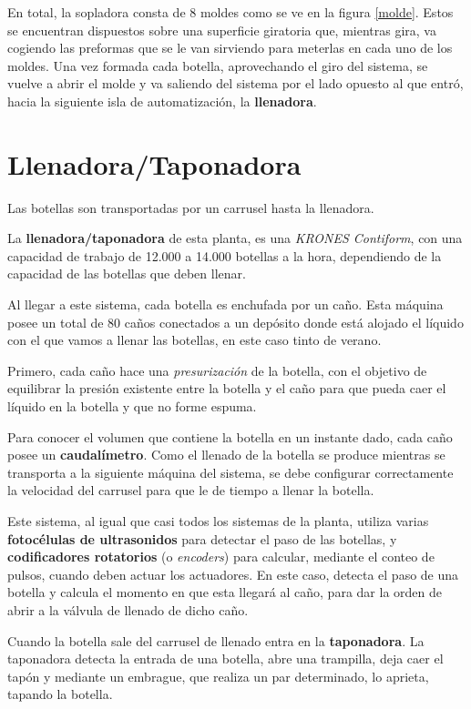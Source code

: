 \documentclass[11pt,a4paper,spanish,twoside]{report}
\begin{document}
En total, la sopladora consta de 8 moldes como se ve en la figura \ref{molde}. Estos se encuentran dispuestos 
sobre una superficie giratoria que, mientras gira, va cogiendo las preformas 
que se le van sirviendo para meterlas en cada uno de los moldes. Una vez 
formada cada botella, aprovechando el giro del sistema, se vuelve a abrir el 
molde y va saliendo del sistema por el lado opuesto al que entró, hacia la 
siguiente isla de automatización, la \textbf{llenadora}.

\section{Llenadora/Taponadora}
Las botellas son transportadas por un carrusel hasta la llenadora.

La \textbf{llenadora/taponadora} de esta planta, es una \emph{KRONES Con\-ti\-form}, con 
una capacidad de trabajo de 12.000 a 14.000 botellas a la hora, dependiendo de
la capacidad de las botellas que deben llenar.

Al llegar a este sistema, cada botella es enchufada por un caño. Esta máquina 
posee un total de 80 caños conectados a un depósito donde está alojado el 
líquido con el que vamos a llenar las botellas, en este caso tinto de verano.

Primero, cada caño hace una \emph{presurización} de la botella, con el 
objetivo de equilibrar la presión existente entre la botella y el caño para 
que pueda caer el líquido en la botella y que no forme espuma.

Para conocer el volumen que contiene la botella en un instante dado, cada caño 
posee un \textbf{caudalímetro}. Como el llenado de la botella se produce
mientras se transporta a la siguiente máquina del sistema, se debe configurar
correctamente la velocidad del carrusel para que le de tiempo a llenar la 
botella.

Este sistema, al igual que casi todos los sistemas de la planta, utiliza 
varias \textbf{fotocélulas de ultrasonidos} para detectar el paso de las 
botellas, y \textbf{codificadores rotatorios} (o \emph{\emph{encoder}s}) para 
calcular, mediante el conteo de pulsos, cuando deben actuar los actuadores. 
En este caso, detecta el paso de una botella y calcula el momento en que esta 
llegará al caño, para dar la orden de abrir a la válvula de llenado de dicho 
caño.

Cuando la botella sale del carrusel de llenado entra en la \textbf{taponadora}.
La taponadora detecta la entrada de una botella, abre una trampilla, deja caer 
el tapón y mediante un embrague, que realiza un par determinado, lo aprieta, 
tapando la botella.
\end{document}
